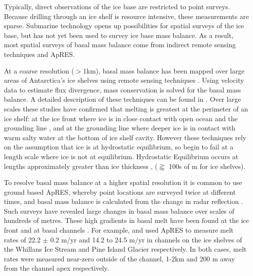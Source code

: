 
Typically, direct observations of the ice base are restricted to point surveys. Because drilling through an  ice shelf is resource intensive, these measurements are sparse.  Submarine technology opens up possibilities for spatial surveys of the ice base, but has not yet been used to survey ice base mass balance.
As a result, most spatial surveys of basal mass balance come from indirect remote sensing techniques and ApRES.  

At a coarse resolution ($>$1km), basal mass balance has been mapped over large areas of Antarctica's ice shelves using remote sensing techniques \citep[e.g.][] {rignot2013ice, mankoff2012role,goldberg2019accurately}. Using velocity data to estimate flux divergence, mass conservation is solved for the basal mass balance. A detailed description of these techniques can be found in \cite{berger2017detecting}.
Over large scales these studies have confirmed that melting is greatest at the perimeter of an  ice shelf: at the ice front where ice is in close contact with open ocean and the grounding line \citep[e.g.][] {rignot2013ice, mankoff2012role,goldberg2019accurately}, and at the grounding line where deeper ice is in contact with warm salty water at the bottom of  ice shelf cavity. 
However these techniques rely on the assumption that ice is at hydrostatic equilibrium, so  begin to fail at a length scale where ice is not at equilibrium. Hydrostatic Equilibrium occurs at lengths approximately greater than ice thickness \citep{gudmundsson2008limit},  ($\gtrapprox$ 100s of m for ice shelves).

To resolve basal mass balance at a higher spatial resolution it is common to use ground based ApRES, whereby point locations are surveyed twice at different times, and basal mass balance is calculated from the change in radar reflection \citep{stanton2013channelized, dutrieux2014basal,marsh2016high}. Such surveys have revealed large changes in basal mass balance over scales of hundreds of metres. These high gradients in basal melt have been found at the ice front \cite[e.g.][]{stewart2019basal} and at basal channels \citep[e.g.][]{stanton2013channelized, marsh2016high}. 
For example, \cite {marsh2016high} and \cite{stanton2013channelized} used ApRES to measure melt rates of 22.2 $\pm$ 0.2 m/yr and 14.2 to 24.5 m/yr in channels on the ice shelves of the Whillans Ice Stream and Pine Island Glacier respectively. In both cases, melt rates were measured near-zero outside of the channel, 1-2km and 200 m away from the channel apex respectively.

